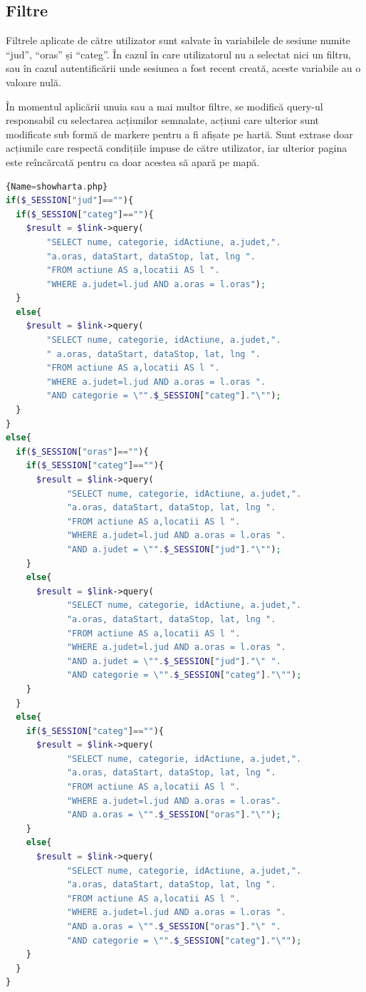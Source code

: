\documentclass[12pt,a4paper]{report}
\begin{document}
\subsection{Filtre}
\par
Filtrele aplicate de către utilizator sunt salvate în variabilele de sesiune numite “jud”, “oras” și “categ”. În cazul în care utilizatorul nu a selectat nici un filtru, sau în cazul autentificării unde sesiunea a fost recent creată, aceste variabile au o valoare nulă.
\\
\par
În momentul aplicării unuia sau a mai multor filtre, se modifică query-ul responsabil cu selectarea acțiunilor semnalate, acțiuni care ulterior sunt modificate sub formă de markere pentru a fi afișate pe hartă. Sunt extrase doar acțiunile care respectă condițiile impuse de către utilizator, iar ulterior pagina este reîncărcată pentru ca doar acestea să apară pe mapă.
\\
\begin{lstlisting}[basicstyle=\small, language=PHP,caption=Query-urile aferente filtrelor aplicate]{Name=showharta.php}
if($_SESSION["jud"]==""){
  if($_SESSION["categ"]==""){
    $result = $link->query(
        "SELECT nume, categorie, idActiune, a.judet,".
        "a.oras, dataStart, dataStop, lat, lng ".
        "FROM actiune AS a,locatii AS l ".
        "WHERE a.judet=l.jud AND a.oras = l.oras");
  }
  else{
    $result = $link->query(
        "SELECT nume, categorie, idActiune, a.judet,".
        " a.oras, dataStart, dataStop, lat, lng ".
        "FROM actiune AS a,locatii AS l ".
        "WHERE a.judet=l.jud AND a.oras = l.oras ".
        "AND categorie = \"".$_SESSION["categ"]."\"");
  }
}
else{
  if($_SESSION["oras"]==""){
    if($_SESSION["categ"]==""){
      $result = $link->query(
            "SELECT nume, categorie, idActiune, a.judet,".
            "a.oras, dataStart, dataStop, lat, lng ".
            "FROM actiune AS a,locatii AS l ".
            "WHERE a.judet=l.jud AND a.oras = l.oras ".
            "AND a.judet = \"".$_SESSION["jud"]."\"");
    }
    else{
      $result = $link->query(
            "SELECT nume, categorie, idActiune, a.judet,".
            "a.oras, dataStart, dataStop, lat, lng ".
            "FROM actiune AS a,locatii AS l ".
            "WHERE a.judet=l.jud AND a.oras = l.oras ".
            "AND a.judet = \"".$_SESSION["jud"]."\" ".
            "AND categorie = \"".$_SESSION["categ"]."\"");
    }
  }
  else{
    if($_SESSION["categ"]==""){
      $result = $link->query(
            "SELECT nume, categorie, idActiune, a.judet,".
            "a.oras, dataStart, dataStop, lat, lng ".
            "FROM actiune AS a,locatii AS l ".
            "WHERE a.judet=l.jud AND a.oras = l.oras".
            "AND a.oras = \"".$_SESSION["oras"]."\"");
    }
    else{
      $result = $link->query(
            "SELECT nume, categorie, idActiune, a.judet,".
            "a.oras, dataStart, dataStop, lat, lng ".
            "FROM actiune AS a,locatii AS l ".
            "WHERE a.judet=l.jud AND a.oras = l.oras ".
            "AND a.oras = \"".$_SESSION["oras"]."\" ".
            "AND categorie = \"".$_SESSION["categ"]."\"");
    }
  }
}
\end{lstlisting}
\end{document}

